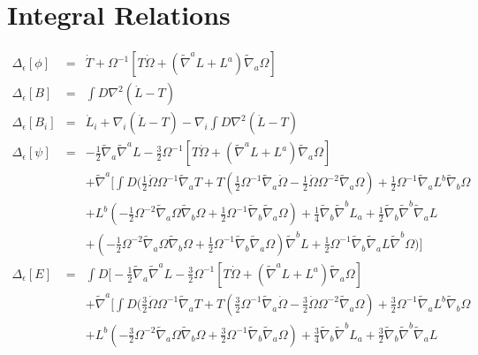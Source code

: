 \documentclass[10pt,letterpaper]{article}
\numberwithin{equation}{section}
\begin{document}
\section{Integral Relations}
%
%
\begin{eqnarray}
\Delta_\epsilon[\phi] &=& \dot{T} + \Omega^{-1}\left[ T \dot \Omega + (\tilde\nabla^a L + L^a)\tilde\nabla_a \Omega\right]
\nonumber\\
%
\Delta_\epsilon[B] &=& \int D \nabla^2(\dot L-T)
\nonumber\\
%
\Delta_\epsilon[B_i] &=&\dot L_i + \nabla_i(\dot L -T) -\nabla_i \int D \nabla^2(\dot L-T)
\nonumber\\
%
\Delta_\epsilon[\psi] &=&  -\tfrac12 \tilde\nabla_a\tilde\nabla^a L - \tfrac32 \Omega^{-1}\left[ T \dot \Omega + (\tilde\nabla^a L + L^a)\tilde\nabla_a \Omega\right]
\nonumber\\
&& + \tilde\nabla^a \bigg[ \int D \bigg( 
\tfrac{1}{2} \dot{\Omega} \Omega^{-1} \tilde{\nabla}_{a}T + T (\tfrac{1}{2} \Omega^{-1} \tilde{\nabla}_{a}\dot{\Omega} -  \tfrac{1}{2} \dot{\Omega} \Omega^{-2} \tilde{\nabla}_{a}\Omega) + \tfrac{1}{2} \Omega^{-1} \tilde{\nabla}_{a}L^{b} \tilde{\nabla}_{b}\Omega \nonumber \\ 
&& + L^{b} (- \tfrac{1}{2} \Omega^{-2} \tilde{\nabla}_{a}\Omega \tilde{\nabla}_{b}\Omega + \tfrac{1}{2} \Omega^{-1} \tilde{\nabla}_{b}\tilde{\nabla}_{a}\Omega) + \tfrac{1}{4} \tilde{\nabla}_{b}\tilde{\nabla}^{b}L_{a} + \tfrac{1}{2} \tilde{\nabla}_{b}\tilde{\nabla}^{b}\tilde{\nabla}_{a}L \nonumber \\ 
&& + (- \tfrac{1}{2} \Omega^{-2} \tilde{\nabla}_{a}\Omega \tilde{\nabla}_{b}\Omega + \tfrac{1}{2} \Omega^{-1} \tilde{\nabla}_{b}\tilde{\nabla}_{a}\Omega) \tilde{\nabla}^{b}L + \tfrac{1}{2} \Omega^{-1} \tilde{\nabla}_{b}\tilde{\nabla}_{a}L \tilde{\nabla}^{b}\Omega 
\bigg)\bigg]
\nonumber\\
%
\Delta_\epsilon[E] &=& \int D \Bigg[ -\tfrac12 \tilde\nabla_a\tilde\nabla^a L - \tfrac32 \Omega^{-1}\left[ T \dot \Omega + (\tilde\nabla^a L + L^a)\tilde\nabla_a \Omega\right]
\nonumber\\
&& + \tilde\nabla^a \bigg[ \int D \bigg(  \tfrac{3}{2} \dot{\Omega} \Omega^{-1} \tilde{\nabla}_{a}T + T (\tfrac{3}{2} \Omega^{-1} \tilde{\nabla}_{a}\dot{\Omega} -  \tfrac{3}{2} \dot{\Omega} \Omega^{-2} \tilde{\nabla}_{a}\Omega) + \tfrac{3}{2} \Omega^{-1} \tilde{\nabla}_{a}L^{b} \tilde{\nabla}_{b}\Omega \nonumber \\ 
&& + L^{b} (- \tfrac{3}{2} \Omega^{-2} \tilde{\nabla}_{a}\Omega \tilde{\nabla}_{b}\Omega + \tfrac{3}{2} \Omega^{-1} \tilde{\nabla}_{b}\tilde{\nabla}_{a}\Omega) + \tfrac{3}{4} \tilde{\nabla}_{b}\tilde{\nabla}^{b}L_{a} + \tfrac{3}{2} \tilde{\nabla}_{b}\tilde{\nabla}^{b}\tilde{\nabla}_{a}L \nonumber \\ 

\end{eqnarray}
\end{document}
